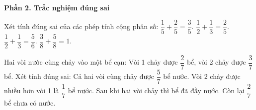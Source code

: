 \textbf{Phần 2. Trắc nghiệm đúng sai}

\begin{ex} %
Xét tính đúng sai của các phép tính cộng phân số:
\choiceTF
{\True $\dfrac{1}{5} + \dfrac{2}{5} = \dfrac{3}{5}$.}
{$\dfrac{1}{2} + \dfrac{1}{3} = \dfrac{2}{5}$.}
{\True $\dfrac{1}{2} + \dfrac{1}{3} = \dfrac{5}{6}$.}
{\True $\dfrac{3}{8} + \dfrac{5}{8} = 1$.}
\end{ex}

\begin{ex} %
Hai vòi nước cùng chảy vào một bể cạn: Vòi 1 chảy được $\dfrac{2}{7}$ bể, vòi 2 chảy được $\dfrac{3}{7}$ bể. Xét tính đúng sai:
\choiceTF
{\True Cả hai vòi cùng chảy được $\dfrac{5}{7}$ bể nước.}
{\True Vòi 2 chảy được nhiều hơn vòi 1 là $\dfrac{1}{7}$ bể nước.}
{Sau khi hai vòi chảy thì bể đã đầy nước.}
{\True Còn lại $\dfrac{2}{7}$ bể chưa có nước.}
\end{ex}


